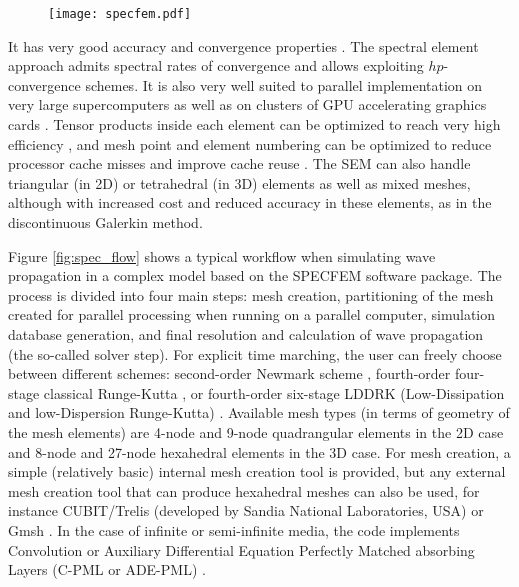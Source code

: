         \begin{figure}[htbp]
                \centerline{\texttt{[image: specfem.pdf]}}
            \label{fig:specfem}
        \end{figure}

It has very good accuracy and convergence properties \citep{Coh02,DeSe07,SeOl08,AiWa09,MeStTh12}.
The spectral element approach admits spectral rates of convergence
and allows exploiting $hp$-convergence schemes. It is also very well
suited to parallel implementation on very large supercomputers \citep{KoTsChTr03,TsKoChTr03,Peter2011Forwardandadjoint}
as well as on clusters of GPU accelerating graphics cards \citep{KoMiEr09,Komatitsch2010Highorderfinite,Kom11}.
Tensor products inside each element can be optimized to reach very
high efficiency \citep{DeFiMu02}, and mesh point and element numbering
can be optimized to reduce processor cache misses and improve cache
reuse \citep{KoLaMi08a}. The SEM can also handle triangular (in 2D)
or tetrahedral (in 3D) elements \citep{WinBoyd96,KoMaTrTaWi01,MeViSa06}
as well as mixed meshes, although with increased cost and reduced
accuracy in these elements, as in the discontinuous Galerkin method.

Figure \ref{fig:spec_flow} shows a typical workflow when simulating wave propagation in a complex model based on the SPECFEM software package.
The process is divided into four main steps: mesh creation, partitioning of the mesh created for parallel processing when running on a parallel computer,
simulation database generation, and final resolution and calculation of wave propagation (the so-called solver step).
For explicit time marching, the user can freely choose between different schemes:
second-order Newmark scheme \parencite{Newmark1959Amethodof}, fourth-order four-stage classical
Runge-Kutta \parencite{Butcher2016Numericalmethodsfor}, or fourth-order six-stage LDDRK (Low-Dissipation and low-Dispersion Runge-Kutta)
\parencite{Berland2006Lowdissipationand}. Available mesh types (in terms of geometry of the mesh elements) are 4-node and 9-node quadrangular elements
in the 2D case and 8-node and 27-node hexahedral elements in the 3D case.
For mesh creation, a simple (relatively basic) internal mesh creation tool is provided, but any external mesh creation tool that can produce hexahedral meshes can also
be used, for instance CUBIT/Trelis (developed by Sandia National Laboratories, USA) or Gmsh \parencite{Geuzaine2009Gmsh:A3}.
In the case of infinite or semi-infinite media, the code implements Convolution or
Auxiliary Differential Equation Perfectly Matched absorbing Layers
(C-PML or ADE-PML) \citep{KoMa07,Komatitsch2008Anunsplitconvolutional,MaKoGeBr10}.

